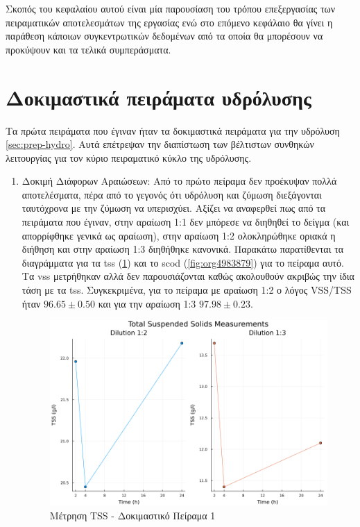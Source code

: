 \documentclass[11pt]{report}
\begin{document}
Σκοπός του κεφαλαίου αυτού είναι μία παρουσίαση του τρόπου επεξεργασίας των πειραματικών αποτελεσμάτων της εργασίας ενώ στο επόμενο κεφάλαιο θα γίνει η παράθεση κάποιων συγκεντρωτικών δεδομένων από τα οποία θα μπορέσουν να προκύψουν και τα τελικά συμπεράσματα.

\section{Δοκιμαστικά πειράματα υδρόλυσης}
\label{sec:org0d878bb}
Τα πρώτα πειράματα που έγιναν ήταν τα δοκιμαστικά πειράματα για την υδρόλυση \autoref{sec:prep-hydro}. Αυτά επέτρεψαν την διαπίστωση των βέλτιστων συνθηκών λειτουργίας για τον κύριο πειραματικό κύκλο της υδρόλυσης.

\begin{enumerate}
\item Δοκιμή Διάφορων Αραιώσεων:
\label{sec:orgc9a40bf}
Από το πρώτο πείραμα δεν προέκυψαν πολλά αποτελέσματα, πέρα από το γεγονός ότι υδρόλυση και ζύμωση διεξάγονται ταυτόχρονα με την ζύμωση να υπερισχύει. Αξίζει να αναφερθεί πως από τα πειράματα που έγιναν, στην αραίωση 1:1 δεν μπόρεσε να διηθηθεί το δείγμα (και απορρίφθηκε γενικά ως αραίωση), στην αραίωση 1:2 ολοκληρώθηκε οριακά η διήθηση και στην αραίωση 1:3 διηθήθηκε κανονικά. Παρακάτω παρατίθενται τα διαγράμματα για τα \acrfull{tss} (\ref{fig:orgdec3c5a}) και το \acrfull{scod} (\ref{fig:org4983879}) για το πείραμα αυτό. Τα \acrfull{vss} μετρήθηκαν αλλά δεν παρουσιάζονται καθώς ακολουθούν ακριβώς την ίδια τάση με τα \acrfull{tss}. Συγκεκριμένα, για το πείραμα με αραίωση 1:2 ο λόγος VSS/TSS ήταν \(96.65 \pm 0.50\) και για την αραίωση 1:3 \(97.98 \pm 0.23\). 

\begin{figure}[htbp]
\centering
\includegraphics[width=.9\linewidth]{../plots/10_10/tss_plot.png}
\caption{\label{fig:orgdec3c5a}Μέτρηση TSS - Δοκιμαστικό Πείραμα 1}
\end{figure}


\end{enumerate}
\end{document}
